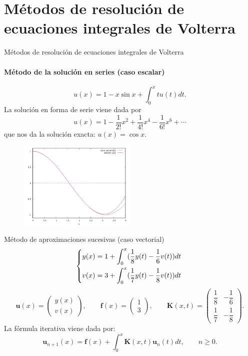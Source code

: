 \documentclass{beamer}
\begin{document}
\section{Métodos de resolución de ecuaciones integrales de Volterra}
\begin{frame}{Métodos de resolución de ecuaciones integrales de Volterra}
	\framesubtitle{Método de la solución en series (caso escalar)}
	\begin{equation*}
		u(x) = 1 - x \sin x + \int_{0}^{x} tu(t)dt.
	\end{equation*}
	La solución en forma de serie viene dada por
	\begin{equation*}
		u(x) = 1 - \dfrac{1}{2!}x^2 + \dfrac{1}{4!}x^4-\dfrac{1}{6!}x^6+\cdots
	\end{equation*}
	que nos da la solución exacta: $u(x) = \cos x.$
	\begin{figure}[h!]
		\centering
		\includegraphics[width=0.5\textwidth]{suma_parcial_sol}
	\end{figure}
\end{frame}
\begin{frame}{Método de aproximaciones sucesivas (caso vectorial)}
	\[ \begin{dcases}
		y(x) = 1 + \displaystyle \int_0^x (\dfrac{1}{8}y(t)-\dfrac{1}{6}v(t))dt \\
		v(x) = 3+ \displaystyle \int_0^x (\dfrac{1}{7}y(t)-\dfrac{1}{8}v(t))dt \;
	\end{dcases} \]%
	\begin{equation*}
		\textbf{u}(x) = \begin{pmatrix}	y(x) \\[6pt] v(x)	\end{pmatrix}, \qquad \textbf{f}(x) = \begin{pmatrix}	1 \\[6pt] 3	\end{pmatrix}, \qquad \textbf{K}(x,t) = \begin{pmatrix}	\dfrac{1}{8} & -\dfrac{1}{6} \\[9pt] \dfrac{1}{7} & -\dfrac{1}{8}	\end{pmatrix}.
	\end{equation*}
	La fórmula iterativa viene dada por:
	\begin{equation*}
		\textbf{u}_{n+1}(x) = \textbf{f}(x) + \int_0^x \textbf{K}(x,t)\textbf{u}_n(t)dt, \qquad n \geqslant 0.
	\end{equation*}
\end{frame}
\end{document}
